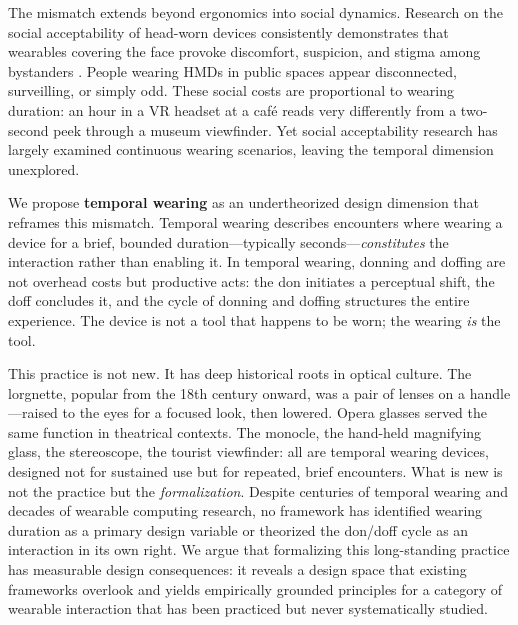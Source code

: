 The mismatch extends beyond ergonomics into social dynamics. Research on the social acceptability of head-worn devices consistently demonstrates that wearables covering the face provoke discomfort, suspicion, and stigma among bystanders \cite{koelle2020social, koelle2017acceptability}. People wearing HMDs in public spaces appear disconnected, surveilling, or simply odd. These social costs are proportional to wearing duration: an hour in a VR headset at a caf\'{e} reads very differently from a two-second peek through a museum viewfinder. Yet social acceptability research has largely examined continuous wearing scenarios, leaving the temporal dimension unexplored.

We propose \textbf{temporal wearing} as an undertheorized design dimension that reframes this mismatch. Temporal wearing describes encounters where wearing a device for a brief, bounded duration---typically seconds---\textit{constitutes} the interaction rather than enabling it. In temporal wearing, donning and doffing are not overhead costs but productive acts: the don initiates a perceptual shift, the doff concludes it, and the cycle of donning and doffing structures the entire experience. The device is not a tool that happens to be worn; the wearing \textit{is} the tool.

This practice is not new. It has deep historical roots in optical culture. The lorgnette, popular from the 18th century onward, was a pair of lenses on a handle---raised to the eyes for a focused look, then lowered. Opera glasses served the same function in theatrical contexts. The monocle, the hand-held magnifying glass, the stereoscope, the tourist viewfinder: all are temporal wearing devices, designed not for sustained use but for repeated, brief encounters. What is new is not the practice but the \textit{formalization}. Despite centuries of temporal wearing and decades of wearable computing research, no framework has identified wearing duration as a primary design variable or theorized the don/doff cycle as an interaction in its own right. We argue that formalizing this long-standing practice has measurable design consequences: it reveals a design space that existing frameworks overlook and yields empirically grounded principles for a category of wearable interaction that has been practiced but never systematically studied.

